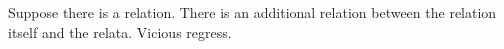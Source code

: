 Suppose there is a relation. There is an additional relation between the relation itself and the relata. Vicious regress.

